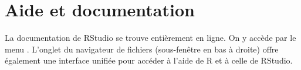 \section{Aide et documentation}
\label{rstudio:aide}

La documentation de RStudio se trouve entièrement en ligne. On y
accède par le menu . L'onglet  du navigateur de
fichiers (sous-fenêtre en bas à droite) offre également une interface
unifiée pour accéder à l'aide de R et à celle de RStudio.


